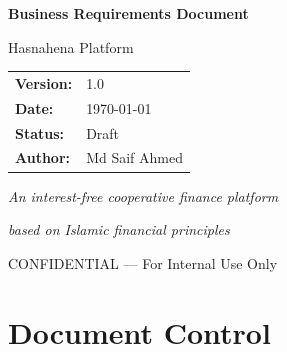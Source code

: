 \documentclass[11pt,a4paper]{article}
\newcommand{\DocumentTitle}{Business Requirements Document}
\newcommand{\DocumentSubtitle}{Hasnahena Platform}
\newcommand{\DocumentVersion}{1.0}
\newcommand{\DocumentDate}{\today}
\begin{document}
\begin{titlepage}
    \centering
    \vspace*{2cm}
    
    {\Huge\bfseries\color{primaryblue}\DocumentTitle\par}
    \vspace{0.5cm}
    {\LARGE\color{darkgray}\DocumentSubtitle\par}
    
    \vspace{1.5cm}
    
    
    \vspace{2cm}
    
    \begin{tabular}{ll}
        \textbf{Version:} & \DocumentVersion \\[0.5em]
        \textbf{Date:} & \DocumentDate \\[0.5em]
        \textbf{Status:} & Draft \\[0.5em]
        \textbf{Author:} & Md Saif Ahmed \\[0.5em]
    \end{tabular}
    
    \vfill
    
    {\large\color{darkgray}\textit{An interest-free cooperative finance platform}\par}
    {\large\color{darkgray}\textit{based on Islamic financial principles}\par}
    
    \vspace{1cm}
    
    {\footnotesize\color{darkgray}CONFIDENTIAL --- For Internal Use Only\par}
\end{titlepage}

\tableofcontents
\newpage

\section*{Document Control}
\end{document}
